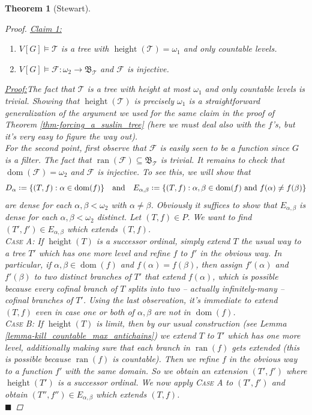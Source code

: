 \documentclass[11pt,a4paper]{report}
\newtheorem{theorem}{Theorem}[chapter] %
\theoremstyle{definition}
\theoremstyle{num.custom-title}
\theoremstyle{custom-title}
\newenvironment{claim}[1]{\par\noindent\underline{Claim#1:}\space}{} %
\newenvironment{claimproof}[1]{\par\noindent\underline{Proof:}\space#1}{\leavevmode\unskip\penalty9999 \hbox{}\nobreak\hfill\quad\hbox{$\blacksquare$}} %
\DeclareMathOperator{\dom}{dom}
\DeclareMathOperator{\ran}{ran}
\DeclareMathOperator{\sse}{\subseteq}
\DeclareMathOperator{\height}{height}
\newcommand{\F}{\mathcal{F}}
\newcommand{\T}{\mathcal{T}}
\newcommand*{\defeq}{\mathrel{\rlap{%
                     \raisebox{0.3ex}{$\cdot$}}%
                     \raisebox{-0.3ex}{$\cdot$}}%
                     =}
\begin{document}
\begin{theorem}[Stewart]
\begin{proof}
\begin{claim}{ 1}
\begin{enumerate}
\item $V[G] \models \T$ is a tree with $\height(\T)=\omega_1$ and only countable levels.
\item $V[G] \models \F \colon \omega_2 \to \mathfrak{B}_{\T}$ and $\F$ is injective.
\end{enumerate}
\begin{claimproof}
The fact that $\T$ is a tree with height at most $\omega_1$ and only countable levels is trivial. Showing that $\height(\T)$ is precisely $\omega_1$ is a straightforward generalization of the argument we used for the same claim in the proof of Theorem \ref{thm-forcing_a_suslin_tree} (here we must deal also with the $f$'s, but it's very easy to figure the way out).\\
For the second point, first observe that $\F$ is easily seen to be a function since $G$ is a filter. The fact that $\ran(\F) \sse \mathfrak{B}_{\T}$ is trivial. It remains to check that $\dom(\F) = \omega_2$ and $\F$ is injective. To see this, we will show that
\[
D_\alpha \defeq \{(T,f) : \alpha \in \dom(f)\} \quad \text{and} \quad
E_{\alpha,\beta} \defeq \{(T,f) : \alpha, \beta \in \dom(f) \text{ and } f(\alpha) \neq f(\beta)\}
\]
are dense for each $\alpha,\beta < \omega_2$ with $\alpha \neq \beta$. Obviously it suffices to show that $E_{\alpha,\beta}$ is dense for each $\alpha,\beta < \omega_2$ distinct. Let $(T,f) \in P$. We want to find $(T',f') \in E_{\alpha,\beta}$ which extends $(T,f)$.\\
\textsc{Case A:} If $\height(T)$ is a successor ordinal, simply extend $T$ the usual way to a tree $T'$ which has one more level and refine $f$ to $f'$ in the obvious way. In particular, if $\alpha,\beta \in \dom(f)$ and $f(\alpha)=f(\beta)$, then assign $f'(\alpha)$ and $f'(\beta)$ to two distinct branches of $T'$ that extend $f(\alpha)$, which is possible because every cofinal branch of $T$ splits into two -- actually infinitely-many -- cofinal branches of $T'$. Using the last observation, it's immediate to extend $(T,f)$ even in case one or both of $\alpha,\beta$ are not in $\dom(f)$.\\
\textsc{Case B:} If $\height(T)$ is limit, then by our usual construction (see Lemma \ref{lemma-kill_countable_max_antichains}) we extend $T$ to $T'$ which has one more level, additionally making sure that each branch in $\ran(f)$ gets extended (this is possible because $\ran(f)$ is countable). Then we refine $f$ in the obvious way to a function $f'$ with the same domain. So we obtain an extension $(T',f')$ where $\height(T')$ is a successor ordinal. We now apply \textsc{Case A} to $(T',f')$ and obtain $(T'',f'') \in E_{\alpha,\beta}$ which extends $(T,f)$.\\

\end{claimproof}
\end{claim}
\end{proof}
\end{theorem}
\end{document}
